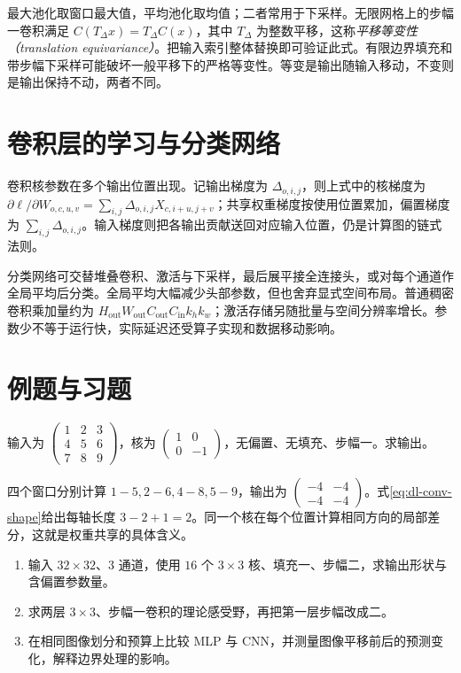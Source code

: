 最大池化取窗口最大值，平均池化取均值；二者常用于下采样。无限网格上的步幅一卷积满足 $C(T_\Delta x)=T_\Delta C(x)$，其中 $T_\Delta$ 为整数平移，这称\emph{平移等变性（translation equivariance）}。把输入索引整体替换即可验证此式。有限边界填充和带步幅下采样可能破坏一般平移下的严格等变性。等变是输出随输入移动，不变则是输出保持不动，两者不同。

\section{卷积层的学习与分类网络}
卷积核参数在多个输出位置出现。记输出梯度为 $\Delta_{o,i,j}$，则上式中的核梯度为 $\partial\ell/\partial W_{o,c,u,v}=\sum_{i,j}\Delta_{o,i,j}X_{c,i+u,j+v}$；共享权重梯度按使用位置累加，偏置梯度为 $\sum_{i,j}\Delta_{o,i,j}$。输入梯度则把各输出贡献送回对应输入位置，仍是计算图的链式法则。

分类网络可交替堆叠卷积、激活与下采样，最后展平接全连接头，或对每个通道作全局平均后分类。全局平均大幅减少头部参数，但也舍弃显式空间布局。普通稠密卷积乘加量约为 $H_{\mathrm{out}}W_{\mathrm{out}}C_{\mathrm{out}}C_{\mathrm{in}}k_hk_w$；激活存储另随批量与空间分辨率增长。参数少不等于运行快，实际延迟还受算子实现和数据移动影响。

\section{例题与习题}
\begin{example}[边缘差分核]
输入为 $\left(\begin{smallmatrix}1&2&3\\4&5&6\\7&8&9\end{smallmatrix}\right)$，核为 $\left(\begin{smallmatrix}1&0\\0&-1\end{smallmatrix}\right)$，无偏置、无填充、步幅一。求输出。
\end{example}
\begin{solve}
四个窗口分别计算 $1-5,2-6,4-8,5-9$，输出为 $\left(\begin{smallmatrix}-4&-4\\-4&-4\end{smallmatrix}\right)$。式\eqref{eq:dl-conv-shape}给出每轴长度 $3-2+1=2$。同一个核在每个位置计算相同方向的局部差分，这就是权重共享的具体含义。
\end{solve}
\begin{enumerate}
\item 输入 $32\times32$、$3$ 通道，使用 $16$ 个 $3\times3$ 核、填充一、步幅二，求输出形状与含偏置参数量。
\item 求两层 $3\times3$、步幅一卷积的理论感受野，再把第一层步幅改成二。
\item 在相同图像划分和预算上比较 MLP 与 CNN，并测量图像平移前后的预测变化，解释边界处理的影响。
\end{enumerate}

